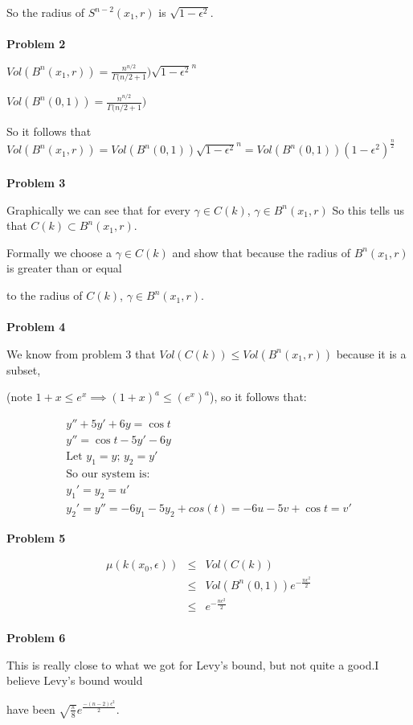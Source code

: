 \documentclass{article}
\begin{document}
So the radius of $S^{n-2}(x_1,r)$ is $\sqrt{1-\epsilon^2}$.
\\~\\

\textbf{Problem 2}

$Vol(B^n(x_1,r)) = \frac{n^{n/2}}{\Gamma(n/2 +1})\sqrt{1-\epsilon^2}^n$

$Vol(B^n(0,1)) = \frac{n^{n/2}}{\Gamma(n/2 +1})$

So it follows that $Vol(B^n(x_1,r)) = Vol(B^n(0,1))\sqrt{1-\epsilon^2}^n = Vol(B^n(0,1))(1-\epsilon^2)^\frac{n}{2}$
\\~\\

\textbf{Problem 3}

Graphically we can see that for every $\gamma \in C(k)$, $\gamma \in B^n(x_1,r)$ So this tells us that $C(k) \subset B^n(x_1,r)$. 

Formally we choose a $\gamma \in C(k)$ and show that because the radius of $B^n(x_1,r)$ is greater than or equal 

to the radius of $C(k)$, $\gamma \in B^n(x_1,r)$. 
\\~\\

\textbf{Problem 4}

We know from problem 3 that $Vol(C(k)) \leq Vol(B^n(x_1,r))$ because it is a subset, 

(note $1+x \leq e^x \implies (1+x)^a \leq (e^x)^a$), so it follows that:  

\begin{eqnarray*}
y'' + 5y' +6y = \cos{t}\\
y'' = \cos{t} - 5y' - 6y\\
\text{Let } y_1 = y \text {; } y_2 = y'\\
\text{So our system is: }\\
y_1' = y_2 = u'\\
y_2' = y''  = -6y_1-5y_2+cos(t) = -6u-5v+\cos{t}=v'
\end{eqnarray*}



\textbf{Problem 5}


\begin{eqnarray*}
\mu(k(x_0,\epsilon)) &\leq& Vol(C(k))\\
&\leq& Vol(B^n(0,1))e^{-\frac{n\epsilon^2}{2}}\\
&\leq& e^{-\frac{n\epsilon^2}{2}}\\
\end{eqnarray*}


\textbf{Problem 6}

This is really close to what we got for Levy's bound, but not quite a good.I believe Levy's bound would 

have been $\sqrt{\frac{\pi}{8}}e^\frac{-(n-2)\epsilon^2}{2}$.
\end{document}
